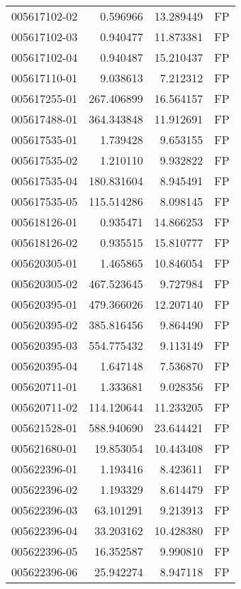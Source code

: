 \begin{tabular}{lrrl}
005617102-02 &    0.596966 &      13.289449 &   FP \\
005617102-03 &    0.940477 &      11.873381 &   FP \\
005617102-04 &    0.940487 &      15.210437 &   FP \\
005617110-01 &    9.038613 &       7.212312 &   FP \\
005617255-01 &  267.406899 &      16.564157 &   FP \\
005617488-01 &  364.343848 &      11.912691 &   FP \\
005617535-01 &    1.739428 &       9.653155 &   FP \\
005617535-02 &    1.210110 &       9.932822 &   FP \\
005617535-04 &  180.831604 &       8.945491 &   FP \\
005617535-05 &  115.514286 &       8.098145 &   FP \\
005618126-01 &    0.935471 &      14.866253 &   FP \\
005618126-02 &    0.935515 &      15.810777 &   FP \\
005620305-01 &    1.465865 &      10.846054 &   FP \\
005620305-02 &  467.523645 &       9.727984 &   FP \\
005620395-01 &  479.366026 &      12.207140 &   FP \\
005620395-02 &  385.816456 &       9.864490 &   FP \\
005620395-03 &  554.775432 &       9.113149 &   FP \\
005620395-04 &    1.647148 &       7.536870 &   FP \\
005620711-01 &    1.333681 &       9.028356 &   FP \\
005620711-02 &  114.120644 &      11.233205 &   FP \\
005621528-01 &  588.940690 &      23.644421 &   FP \\
005621680-01 &   19.853054 &      10.443408 &   FP \\
005622396-01 &    1.193416 &       8.423611 &   FP \\
005622396-02 &    1.193329 &       8.614479 &   FP \\
005622396-03 &   63.101291 &       9.213913 &   FP \\
005622396-04 &   33.203162 &      10.428380 &   FP \\
005622396-05 &   16.352587 &       9.990810 &   FP \\
005622396-06 &   25.942274 &       8.947118 &   FP \\

\end{tabular}
